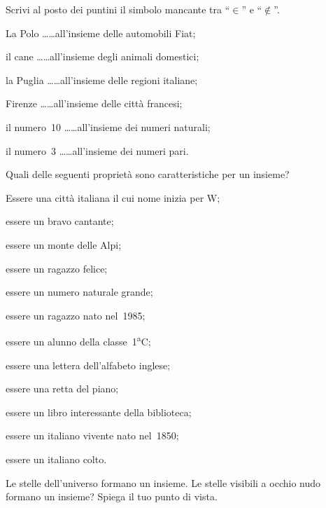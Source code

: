 \begin{esercizio}
\label{ese:5.6}
Scrivi al posto dei puntini il simbolo mancante tra ``$\in$'' e ``$\notin$''.

\begin{enumeratea}
\item La Polo \ldots\ldots all'insieme delle automobili Fiat;
\item il cane \ldots\ldots all'insieme degli animali domestici;
\item la Puglia \ldots\ldots all'insieme delle regioni italiane;
\item Firenze \ldots\ldots all'insieme delle città francesi;
\item il numero~10 \ldots\ldots all'insieme dei numeri naturali;
\item il numero~3 \ldots\ldots all'insieme dei numeri pari.
\end{enumeratea}
\end{esercizio}
\pagebreak
\begin{esercizio}
\label{ese:5.7}
Quali delle seguenti proprietà sono caratteristiche per un insieme?
\TabPositions{8.5cm}
\begin{enumeratea}
\item Essere una città italiana il cui nome inizia per W; \tab\boxV\quad\boxF
\item essere un bravo cantante; \tab\boxV\quad\boxF
\item essere un monte delle Alpi;  \tab\boxV\quad\boxF
\item essere un ragazzo felice; \tab\boxV\quad\boxF
\item essere un numero naturale grande;\tab\boxV\quad\boxF
\item essere un ragazzo nato nel~1985; \tab\boxV\quad\boxF
\item essere un alunno della classe~1\textsuperscript{a}C; \tab\boxV\quad\boxF
\item essere una lettera dell'alfabeto inglese; \tab\boxV\quad\boxF
\item essere una retta del piano; \tab\boxV\quad\boxF
\item essere un libro interessante della biblioteca; \tab\boxV\quad\boxF
\item essere un italiano vivente nato nel~1850; \tab\boxV\quad\boxF
\item essere un italiano colto. \tab\boxV\quad\boxF
\end{enumeratea}
\end{esercizio}

\begin{esercizio}
\label{ese:5.8}
Le stelle dell'universo formano un insieme. Le stelle visibili a occhio nudo formano un insieme? Spiega il tuo punto di vista.
\end{esercizio}

